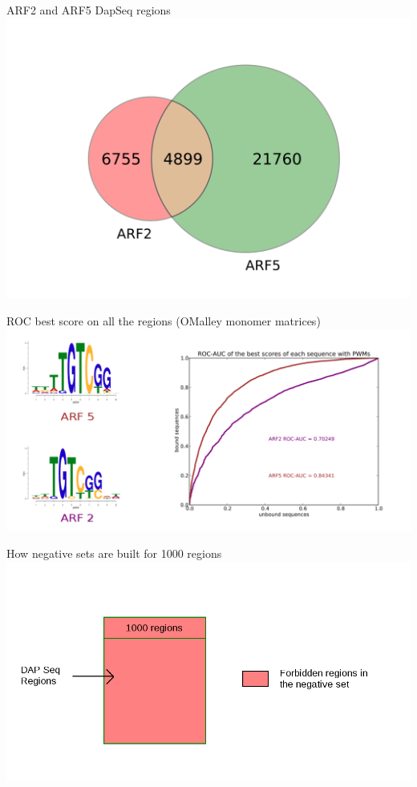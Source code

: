 \documentclass{beamer}
\begin{document}
\begin{frame}{ARF2 and ARF5 DapSeq regions}
  \includegraphics[width=1\textwidth,height=0.8\textheight,center]{Venn.png}
\end{frame}


\begin{frame}{ROC best score on all the regions (OMalley monomer matrices)}
  \includegraphics[width=1\textwidth,height=0.8\textheight,center]{ROC_et_logo.png}
\end{frame}


\begin{frame}{How negative sets are built for 1000 regions}
  \includegraphics[width=1\textwidth,height=0.8\textheight,center]{negative_set_all_regions.png}
\end{frame}
\end{document}
